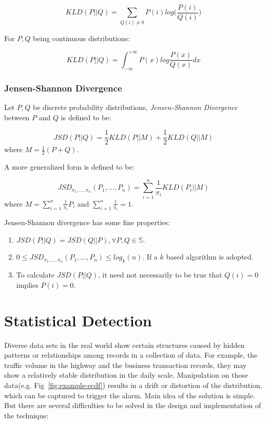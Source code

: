 \documentclass[a4paper]{IEEEtran}
\begin{document}
		\begin{equation}
		KLD(P||Q) = \sum_{Q(i)\ne 0} P(i)log\Big(\frac{P(i)}{Q(i)}\Big)
		\end{equation}
		
		For $P,Q$ being continuous distributions:
		
		\begin{equation}
			KLD(P||Q) = \int_{-\infty}^{+\infty} P(x)log\frac{P(x)}{Q(x)}dx
		\end{equation}
		
		\subsubsection{Jensen-Shannon Divergence}
		Let $P,Q$ be discrete probability distributions, \textit{Jensen-Shannon Divergence} between $P$ and $Q$ is defined to be:
		
		\begin{equation}
		JSD(P||Q) = \frac{1}{2}KLD(P||M) + \frac{1}{2}KLD(Q||M)
		\end{equation}
		where $\displaystyle M = \frac{1}{2}(P+Q)$.
		
		A more generalized form is defined to be:
		
		\begin{equation}
		JSD_{\pi_1, \dots, \pi_n}(P_1, \dots, P_n) = \sum_{i=1}^{n}\frac{1}{\pi_i}KLD(P_i||M)
		\end{equation}
		where $\displaystyle M = \sum_{i=1}^{n}\frac{1}{\pi_i}P_i$ and $\displaystyle \sum_{i=1}^{n}\frac{1}{\pi_i} = 1$.
		
		Jensen-Shannon divergence has some fine properties:
		\begin{enumerate}
			\item $JSD(P||Q) = JSD(Q||P), \forall P, Q\in \mathbb{S}$.
			\item $0 \le JSD_{\pi_1, \dots, \pi_n}(P_1, \dots, P_n) \le log_k(n)$. If a $k$ based algorithm is adopted.
			\item To calculate $JSD(P||Q)$, it need not necessarily to be true that $Q(i)=0$ implies $P(i)=0$.
		\end{enumerate}
	
	\section{Statistical Detection}\label{sec:algorithm-details}
		Diverse data sets in the real world show certain structures caused by hidden patterns or relationships among records in a collection of data. For example, the traffic volume in the highway and the business transaction records, they may show a relatively stable distribution in the daily scale. Manipulation on those data(e.g. Fig~\ref{fig:example-ecdf}) results in a drift or distortion of the distribution, which can be captured to trigger the alarm. Main idea of the solution is simple. But there are several difficulties to be solved in the design and implementation of the technique:
		
\end{document}
